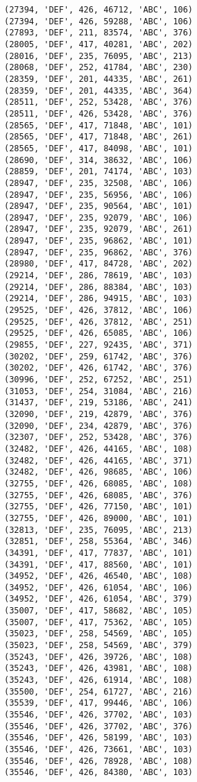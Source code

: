 \begin{verbatim}
(27394, 'DEF', 426, 46712, 'ABC', 106)
(27394, 'DEF', 426, 59288, 'ABC', 106)
(27893, 'DEF', 211, 83574, 'ABC', 376)
(28005, 'DEF', 417, 40281, 'ABC', 202)
(28016, 'DEF', 235, 76095, 'ABC', 213)
(28068, 'DEF', 252, 41784, 'ABC', 230)
(28359, 'DEF', 201, 44335, 'ABC', 261)
(28359, 'DEF', 201, 44335, 'ABC', 364)
(28511, 'DEF', 252, 53428, 'ABC', 376)
(28511, 'DEF', 426, 53428, 'ABC', 376)
(28565, 'DEF', 417, 71848, 'ABC', 101)
(28565, 'DEF', 417, 71848, 'ABC', 261)
(28565, 'DEF', 417, 84098, 'ABC', 101)
(28690, 'DEF', 314, 38632, 'ABC', 106)
(28859, 'DEF', 201, 74174, 'ABC', 103)
(28947, 'DEF', 235, 32508, 'ABC', 106)
(28947, 'DEF', 235, 56956, 'ABC', 106)
(28947, 'DEF', 235, 90564, 'ABC', 101)
(28947, 'DEF', 235, 92079, 'ABC', 106)
(28947, 'DEF', 235, 92079, 'ABC', 261)
(28947, 'DEF', 235, 96862, 'ABC', 101)
(28947, 'DEF', 235, 96862, 'ABC', 376)
(28980, 'DEF', 417, 84728, 'ABC', 202)
(29214, 'DEF', 286, 78619, 'ABC', 103)
(29214, 'DEF', 286, 88384, 'ABC', 103)
(29214, 'DEF', 286, 94915, 'ABC', 103)
(29525, 'DEF', 426, 37812, 'ABC', 106)
(29525, 'DEF', 426, 37812, 'ABC', 251)
(29525, 'DEF', 426, 65085, 'ABC', 106)
(29855, 'DEF', 227, 92435, 'ABC', 371)
(30202, 'DEF', 259, 61742, 'ABC', 376)
(30202, 'DEF', 426, 61742, 'ABC', 376)
(30996, 'DEF', 252, 67252, 'ABC', 251)
(31053, 'DEF', 254, 31084, 'ABC', 216)
(31437, 'DEF', 219, 53186, 'ABC', 241)
(32090, 'DEF', 219, 42879, 'ABC', 376)
(32090, 'DEF', 234, 42879, 'ABC', 376)
(32307, 'DEF', 252, 53428, 'ABC', 376)
(32482, 'DEF', 426, 44165, 'ABC', 108)
(32482, 'DEF', 426, 44165, 'ABC', 371)
(32482, 'DEF', 426, 98685, 'ABC', 106)
(32755, 'DEF', 426, 68085, 'ABC', 108)
(32755, 'DEF', 426, 68085, 'ABC', 376)
(32755, 'DEF', 426, 77150, 'ABC', 101)
(32755, 'DEF', 426, 89000, 'ABC', 101)
(32813, 'DEF', 235, 76095, 'ABC', 213)
(32851, 'DEF', 258, 55364, 'ABC', 346)
(34391, 'DEF', 417, 77837, 'ABC', 101)
(34391, 'DEF', 417, 88560, 'ABC', 101)
(34952, 'DEF', 426, 46540, 'ABC', 108)
(34952, 'DEF', 426, 61054, 'ABC', 106)
(34952, 'DEF', 426, 61054, 'ABC', 379)
(35007, 'DEF', 417, 58682, 'ABC', 105)
(35007, 'DEF', 417, 75362, 'ABC', 105)
(35023, 'DEF', 258, 54569, 'ABC', 105)
(35023, 'DEF', 258, 54569, 'ABC', 379)
(35243, 'DEF', 426, 39726, 'ABC', 108)
(35243, 'DEF', 426, 43981, 'ABC', 108)
(35243, 'DEF', 426, 61914, 'ABC', 108)
(35500, 'DEF', 254, 61727, 'ABC', 216)
(35539, 'DEF', 417, 99446, 'ABC', 106)
(35546, 'DEF', 426, 37702, 'ABC', 103)
(35546, 'DEF', 426, 37702, 'ABC', 376)
(35546, 'DEF', 426, 58199, 'ABC', 103)
(35546, 'DEF', 426, 73661, 'ABC', 103)
(35546, 'DEF', 426, 78928, 'ABC', 108)
(35546, 'DEF', 426, 84380, 'ABC', 103)

\end{verbatim}
